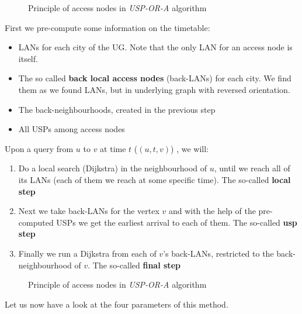 	\begin{figure}[h!]
		\begin{center}
		\end{center}
		\caption{\label{fig:uspora} Principle of access nodes in \textit{USP-OR-A} algorithm}
	\end{figure}
	
	
	
	    First we pre-compute some information on the timetable:
	    \begin{itemize}
	    	\item LANs for each city of the UG. Note that the only LAN for an access node is itself.
	    	\item The so called \textbf{back local access nodes} (back-LANs) for each city. We find them as we found LANs, but in underlying graph with reversed orientation.
	    	\item The back-neighbourhoods, created in the previous step
	    	\item All USPs among access nodes
	    \end{itemize}
	    \hspace{\fill}
	    
	    Upon a query from $u$ to $v$ at time $t$ ($(u, t, v)$) , we will:
	    \begin{enumerate}
	    	\item Do a local search (Dijkstra) in the neighbourhood of $u$, until we reach all of its LANs (each of them we reach at some specific time). The so-called \textbf{local step}
	    	\item Next we take back-LANs for the vertex $v$ and with the help of the pre-computed USPs we get the earliest arrival to each of them. The so-called \textbf{usp step}
	    	\item Finally we run a Dijkstra from each of $v$'s back-LANs, restricted to the back-neighbourhood of $v$. The so-called \textbf{final step}
	    \end{enumerate}
	    \hspace{\fill}
	    
	    \begin{figure}[h!]
		\begin{center}
		\end{center}
		\caption{\label{fig:uspora} Principle of access nodes in \textit{USP-OR-A} algorithm}
	\end{figure}
	
	Let us now have a look at the four parameters of this method. \\
	
